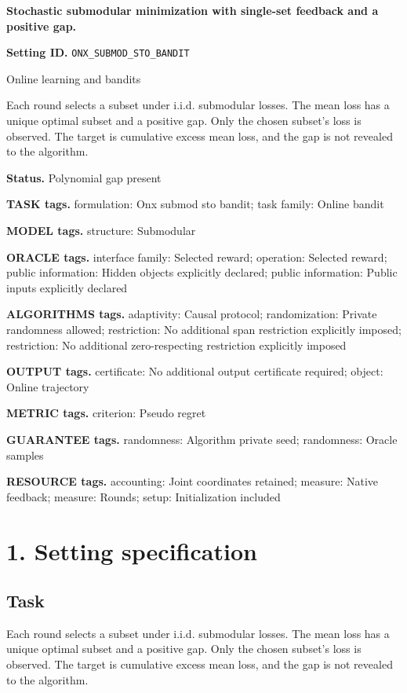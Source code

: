 \documentclass[10pt,a4paper]{article}
\begin{document}
\raggedright

{\LARGE\bfseries\sffamily\color{AtlasNavy} Stochastic submodular minimization with single-set feedback and a positive gap.\par}\vspace{5pt}
\textbf{Setting ID.} \texttt{ONX\_\allowbreak{}SUBMOD\_\allowbreak{}STO\_\allowbreak{}BANDIT}

Online learning and bandits

Each round selects a subset under i.i.d. submodular losses. The mean loss has a unique optimal subset and a positive gap. Only the chosen subset's loss is observed. The target is cumulative excess mean loss, and the gap is not revealed to the algorithm.

\textbf{Status.} Polynomial gap present

\textbf{TASK tags.} formulation: Onx submod sto bandit; task family: Online bandit

\textbf{MODEL tags.} structure: Submodular

\textbf{ORACLE tags.} interface family: Selected reward; operation: Selected reward; public information: Hidden objects explicitly declared; public information: Public inputs explicitly declared

\textbf{ALGORITHMS tags.} adaptivity: Causal protocol; randomization: Private randomness allowed; restriction: No additional span restriction explicitly imposed; restriction: No additional zero-respecting restriction explicitly imposed

\textbf{OUTPUT tags.} certificate: No additional output certificate required; object: Online trajectory

\textbf{METRIC tags.} criterion: Pseudo regret

\textbf{GUARANTEE tags.} randomness: Algorithm private seed; randomness: Oracle samples

\textbf{RESOURCE tags.} accounting: Joint coordinates retained; measure: Native feedback; measure: Rounds; setup: Initialization included

\section{1. Setting specification}
\subsection{Task}
Each round selects a subset under i.i.d. submodular losses. The mean loss has a unique optimal subset and a positive gap. Only the chosen subset's loss is observed. The target is cumulative excess mean loss, and the gap is not revealed to the algorithm.
\end{document}
